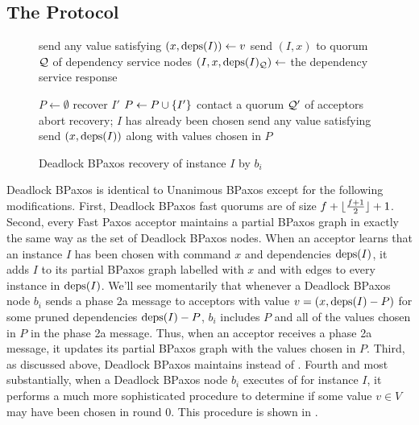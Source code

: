 \subsection{The Protocol}
\begin{wrapfigure}{r}{3.6in}
  \begin{minipage}{3.6in}
    \begin{algorithm}[H]
      \caption{Deadlock BPaxos recovery of instance $I$ by $b_i$}%
      \begin{algorithmic}[1]
          \State send any value satisfying 
        \Else{}
          \State $(x, \text{deps}(I)) \gets v$
        \EndIf{}
        \State send $(I, x)$ to quorum $\mathcal{Q}$ of dependency service nodes
        \State $(I, x, \text{deps}(I)_{\mathcal{Q}}) \gets$ the dependency service response

        \State
        \State $P \gets \emptyset$
            \State recover $I'$
          \EndIf
            \State $P \gets P \cup \{I'\}$
          \Else{}
            \State contact a quorum $\mathcal{Q}'$ of acceptors
              \State abort recovery; $I$ has already been chosen
            \Else{}
              \State send any value satisfying 
            \EndIf{}
          \EndIf{}
        \EndFor{}
        \State send $(x, \text{deps}(I))$ along with values chosen in $P$
      \end{algorithmic}
    \end{algorithm}
  \end{minipage}
\end{wrapfigure}

Deadlock BPaxos is identical to Unanimous BPaxos except for the
following modifications.
%
First, Deadlock BPaxos fast quorums are of size $f + \lfloor\frac{f + 1}{2}\rfloor + 1$.
%
Second, every Fast Paxos acceptor maintains a partial BPaxos graph in exactly
the same way as the set of Deadlock BPaxos nodes. When an acceptor learns that
an instance $I$ has been chosen with command $x$ and dependencies $\text{deps}(I)$,
it adds $I$ to its partial BPaxos graph labelled with $x$ and with edges to
every instance in $\text{deps}(I)$.  We'll see momentarily that whenever a Deadlock
BPaxos node $b_i$ sends a phase 2a message to acceptors with value $v = (x,
\text{deps}(I) - P)$ for some pruned dependencies $\text{deps}(I) - P$, $b_i$ includes $P$
and all of the values chosen in $P$ in the phase 2a message. Thus, when an
acceptor receives a phase 2a message, it updates its partial BPaxos graph with
the values chosen in $P$.
%
Third, as discussed above, Deadlock BPaxos maintains
 instead of .
%
Fourth and most substantially, when a Deadlock BPaxos node $b_i$ executes
 of  for instance $I$, it
performs a much more sophisticated procedure to determine if some value $v \in
V$ may have been chosen in round $0$. This procedure is shown in
.

